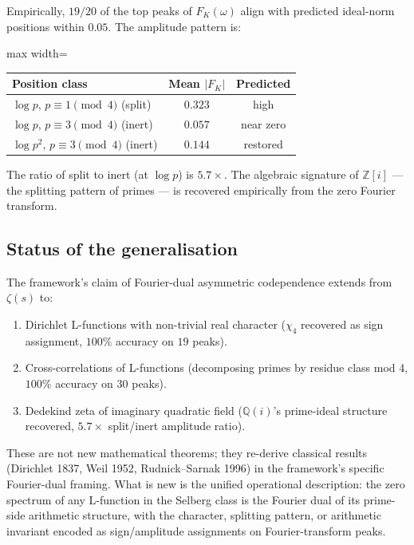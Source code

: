 \documentclass[11pt,a4paper]{article}
\theoremstyle{plain}
\theoremstyle{definition}
\theoremstyle{remark}
\begin{document}
Empirically, $19/20$ of the top peaks of $F_K(\omega)$ align with
predicted ideal-norm positions within $0.05$. The amplitude pattern
is:

\begin{center}
\begin{adjustbox}{max width=\linewidth}\begin{tabular}{lcc}
\toprule
Position class & Mean $|F_K|$ & Predicted \\
\midrule
$\log p$, $p \equiv 1 \pmod{4}$ (split) & $0.323$ & high \\
$\log p$, $p \equiv 3 \pmod{4}$ (inert) & $0.057$ & near zero \\
$\log p^2$, $p \equiv 3 \pmod{4}$ (inert) & $0.144$ & restored \\
\bottomrule
\end{tabular}\end{adjustbox}
\end{center}

The ratio of split to inert (at $\log p$) is $5.7\times$. The algebraic
signature of $\mathbb{Z}[i]$ --- the splitting pattern of primes ---
is recovered empirically from the zero Fourier transform.

\subsection{Status of the generalisation}
\label{sec:lfunctions-status}

The framework's claim of Fourier-dual asymmetric codependence extends
from $\zeta(s)$ to:
\begin{enumerate}
\item Dirichlet L-functions with non-trivial real character ($\chi_4$
recovered as sign assignment, $100\%$ accuracy on $19$ peaks).
\item Cross-correlations of L-functions (decomposing primes by residue
class mod 4, $100\%$ accuracy on $30$ peaks).
\item Dedekind zeta of imaginary quadratic field ($\mathbb{Q}(i)$'s
prime-ideal structure recovered, $5.7\times$ split/inert amplitude ratio).
\end{enumerate}

These are not new mathematical theorems; they re-derive classical results
(Dirichlet 1837, Weil 1952, Rudnick--Sarnak 1996) in the framework's
specific Fourier-dual framing. What is new is the unified operational
description: the zero spectrum of any L-function in the Selberg class
is the Fourier dual of its prime-side arithmetic structure, with the
character, splitting pattern, or arithmetic invariant encoded as
sign/amplitude assignments on Fourier-transform peaks.
\end{document}
